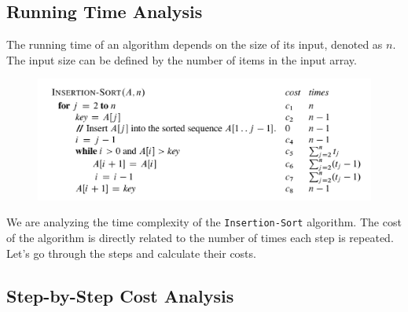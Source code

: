     \subsection{Running Time Analysis}
    The running time of an algorithm depends on the size of its input, denoted as $n$. The input size can be defined by the number of items in the input array.
    \begin{figure}[h]
        \centering
        \includegraphics[width=0.9\linewidth]{insertion_sort.png}
    \end{figure}
    
    We are analyzing the time complexity of the \texttt{Insertion-Sort} algorithm. The cost of the algorithm is directly related to the number of times each step is repeated. Let’s go through the steps and calculate their costs.
    
    \subsection{Step-by-Step Cost Analysis}
    
